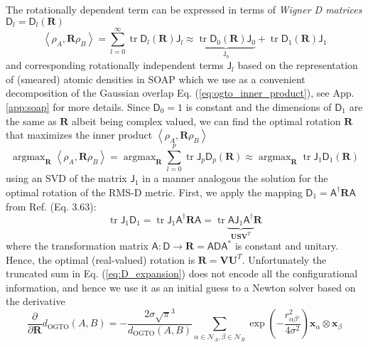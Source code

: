 \documentclass[journal=jctcce,manuscript=article]{achemso}
\newcommand{\aref}[1]{{App. \ref{#1}}}
\newcommand{\eref}[1]{{Eq. (\ref{#1})}}
\newcommand{\cref}[1]{{Ref. \citenum{#1}}}
\newcommand{\tr}{\operatorname{tr}}
\newcommand{\argmax}{\operatorname{argmax}}
\newcommand{\As}{\mathsf{A}}
\newcommand{\xb}{\mathbf{x}}
\newcommand{\Rb}{\mathbf{R}}
\newcommand{\Ib}{\mathbf{I}}
\newcommand{\Js}{\mathsf{J}}
\newcommand{\Ub}{\mathbf{U}}
\newcommand{\Vb}{\mathbf{V}}
\newcommand{\Sb}{\mathbf{S}}
\newcommand{\Ds}{\mathsf{D}}
\newcommand{\Nc}{\mathcal{N}}
\begin{document}
The rotationally dependent term can be expressed in terms of \emph{Wigner D matrices} \cite{BiedenharnLouck} $\Ds_l = \Ds_l(\Rb)$ 
\begin{equation}
\left<\rho_A,\Rb \rho_B\right> 
= \sum_{l=0}^\infty \tr \Ds_l(\Rb) \Js_l
\approx \underbrace{\tr \Ds_0(\Rb) \Js_0}_{\Js_0}  + \tr \Ds_1(\Rb) \Js_1
\end{equation}
and corresponding rotationally independent terms $\Js_l$ based on the representation of (smeared) atomic densities in SOAP which we use as a convenient decomposition of the Gaussian overlap \eref{eq:ogto_inner_product}, see \aref{app:soap} for more details.
Since  $\Ds_0 = 1 $ is constant and the dimensions of $\Ds_1$ are the same as $\Rb$ albeit being complex valued, 
we can find the optimal rotation $\Rb$ that maximizes the inner product $\left<\rho_A,\Rb \rho_B \right>$ 
\begin{equation} \label{eq:D_expansion}
\argmax_\Rb \left<\rho_A,\Rb \rho_B\right>  =
\argmax_\Rb \sum_{l=0}^p \tr \Js_p \Ds_p(\Rb) 
\approx \argmax_\Rb \tr \Js_1 \Ds_1(\Rb)
\end{equation}
using an SVD of the matrix $\Js_1$ in a manner analogous the solution for the optimal rotation of the RMS-D metric.
First, we apply the mapping $ \Ds_1 = \As^\dagger \Rb \As $ from \cref{BiedenharnLouck} (Eq. 3.63): 
\begin{equation}
\tr \Js_1 \Ds_1
= \tr \Js_1 \As^\dagger \Rb \As  
= \tr \underbrace{ \As \Js_1 \As^\dagger }_{\Ub \Sb \Vb^T} \Rb
\end{equation}
where the transformation matrix $\As: \Ds \rightarrow \Rb = \As \Ds \As^*$ is constant and unitary.
Hence, the optimal (real-valued) rotation is $\Rb = \Vb \Ub^T$.
Unfortunately the truncated sum in \eref{eq:D_expansion} does not encode all the configurational information, and hence we use it as an initial guess to a Newton solver based on the derivative 
\begin{equation}
\frac{\partial}{\partial \Rb} d_\text{OGTO}(A,B) =  -\frac{2 \sigma \sqrt{\pi}^3}{d_\text{OGTO}(A,B)} \sum_{\alpha\in\Nc_A,\beta\in\Nc_B} \exp\left( -\frac{r_{\alpha\beta'}^2}{4 \sigma^2} \right)  \xb_\alpha \otimes \xb_\beta
\end{equation}
\end{document}
